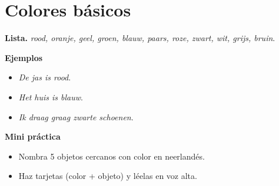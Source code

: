 \section{Colores básicos}
\textbf{Lista.} \textit{rood, oranje, geel, groen, blauw, paars, roze, zwart, wit, grijs, bruin}.

\textbf{Ejemplos}
\begin{itemize}[leftmargin=*]
  \item \textit{De jas is rood}.
  \item \textit{Het huis is blauw}.
  \item \textit{Ik draag graag zwarte schoenen}.
\end{itemize}

\textbf{Mini práctica}
\begin{itemize}[leftmargin=*]
  \item Nombra 5 objetos cercanos con color en neerlandés.
  \item Haz tarjetas (color + objeto) y léelas en voz alta.
\end{itemize}
